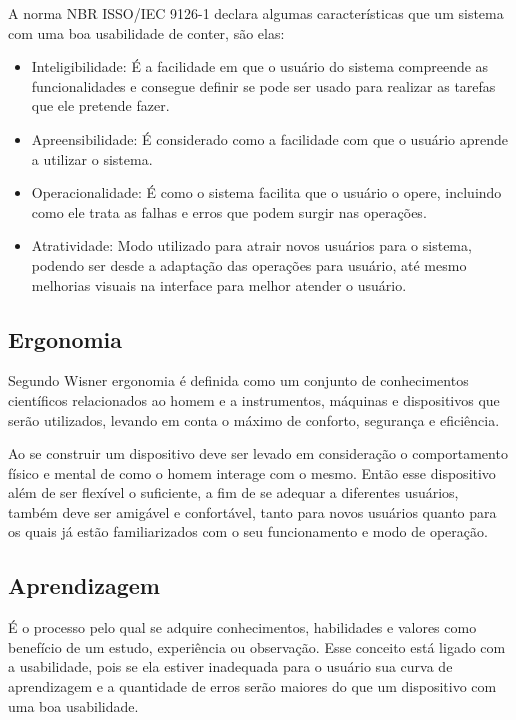\documentclass[
	12pt,			%
	openright,		%
	oneside,			%
	a4paper,			%
	chapter=TITLE,		%
	english,			%
	brazil,			%
	]{abntex2}
\begin{document}
A norma NBR ISSO/IEC 9126-1  declara algumas características que um sistema com uma boa usabilidade de conter, são elas:

\begin{itemize}
\item Inteligibilidade:
É a facilidade em que o usuário do sistema compreende as funcionalidades e consegue definir se pode ser usado para realizar as tarefas que ele pretende fazer.

\item Apreensibilidade:
É considerado como a facilidade com que o usuário aprende a utilizar o sistema.

\item Operacionalidade:
É como o sistema facilita que o usuário o opere, incluindo como ele trata as falhas e erros que podem surgir nas operações.

\item Atratividade:
Modo utilizado para atrair novos usuários para o sistema, podendo ser desde a adaptação das operações para usuário, até mesmo melhorias visuais na interface para melhor atender o usuário.

\end{itemize}

\subsection{Ergonomia}

Segundo Wisner  ergonomia é definida como um conjunto de conhecimentos científicos relacionados ao homem e a instrumentos, máquinas e dispositivos que serão utilizados, levando em conta o máximo de conforto, segurança e eficiência.

Ao se construir um dispositivo deve ser levado em consideração o comportamento físico e mental de como o homem interage com o mesmo. Então esse dispositivo além de ser flexível o suficiente, a fim de se adequar a diferentes usuários, também deve ser amigável e confortável, tanto para novos usuários quanto para os quais já estão familiarizados com o seu funcionamento e modo de operação.

\subsection{Aprendizagem}

É o processo pelo qual se adquire conhecimentos, habilidades e valores como benefício de um estudo, experiência ou observação. Esse conceito está ligado com a usabilidade, pois se ela estiver inadequada para o usuário sua curva de aprendizagem e a quantidade de erros serão maiores do que um dispositivo com uma boa usabilidade.
\end{document}
